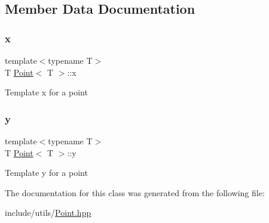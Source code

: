 \subsection{Member Data Documentation}
\mbox{\label{classPoint_a401d07562afaf0079121218025e66b76}} 
\subsubsection{\texorpdfstring{x}{x}}
{\footnotesize\ttfamily template$<$typename T$>$ \\
T \hyperlink{classPoint}{Point}$<$ T $>$\+::x}

Template x for a point \mbox{\label{classPoint_a65146418a33ebb2cd9acb85cade60ac9}} 
\subsubsection{\texorpdfstring{y}{y}}
{\footnotesize\ttfamily template$<$typename T$>$ \\
T \hyperlink{classPoint}{Point}$<$ T $>$\+::y}

Template y for a point 

The documentation for this class was generated from the following file\+:\begin{DoxyCompactItemize}
\item 
include/utils/\hyperlink{Point_8hpp}{Point.\+hpp}\end{DoxyCompactItemize}
